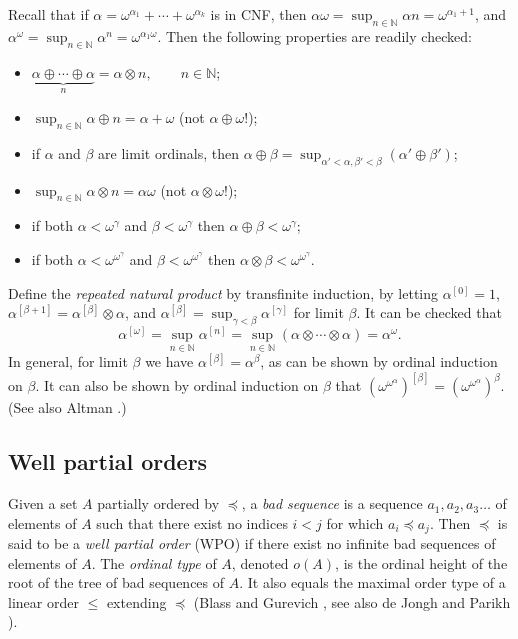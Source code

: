 \documentclass{article}
\theoremstyle{definition}
\begin{document}
Recall that if $\alpha=\omega^{\alpha_1}+\cdots+\omega^{\alpha_k}$ is in CNF, then $\alpha\omega = \sup_{n\in\mathbb N} \alpha n = \omega^{\alpha_1+1}$, and $\alpha^\omega = \sup_{n\in\mathbb N} \alpha^n= \omega^{\alpha_1\omega}$. Then the following properties are readily checked:
\begin{itemize}
    \item $\underbrace{\alpha\oplus\cdots\oplus\alpha}_n = \alpha\otimes n,\qquad n\in\mathbb N$;
    \item $\sup_{n\in\mathbb N}\alpha\oplus n = \alpha+\omega$ (not $\alpha\oplus\omega$!);
    \item if $\alpha$ and $\beta$ are limit ordinals, then $\alpha\oplus\beta = \sup_{\alpha'<\alpha,\beta'<\beta} (\alpha'\oplus\beta')$;
    \item $\sup_{n\in\mathbb N}\alpha\otimes n = \alpha\omega$ (not $\alpha\otimes\omega$!);
    \item if both $\alpha<\omega^\gamma$ and $\beta<\omega^\gamma$ then $\alpha\oplus\beta<\omega^\gamma$;
    \item if both $\alpha<\omega^{\omega^\gamma}$ and $\beta<\omega^{\omega^\gamma}$ then $\alpha\otimes\beta<\omega^{\omega^\gamma}$.
\end{itemize}

Define the \emph{repeated natural product} by transfinite induction, by letting $\alpha^{[0]} = 1$, $\alpha^{[\beta+1]}=\alpha^{[\beta]}\otimes\alpha$, and $\alpha^{[\beta]}=\sup_{\gamma<\beta}\alpha^{[\gamma]}$ for limit $\beta$. It can be checked that
\begin{equation*}
    \alpha^{[\omega]} = \sup_{n\in\mathbb N} \alpha^{[n]} = \sup_{n\in\mathbb N} (\alpha\otimes\cdots\otimes\alpha) = \alpha^\omega.
\end{equation*}
In general, for limit $\beta$ we have $\alpha^{[\beta]} = \alpha^\beta$, as can be shown by ordinal induction on $\beta$. It can also be shown by ordinal induction on $\beta$ that $(\omega^{\omega^\alpha})^{[\beta]} = (\omega^{\omega^\alpha})^\beta$. (See also Altman \cite{altman}.)

\subsection{Well partial orders}\label{subsec_WPO}

Given a set $A$ partially ordered by $\preceq$, a \emph{bad sequence} is a sequence $a_1,a_2,a_3\ldots$ of elements of $A$ such that there exist no indices $i<j$ for which $a_i\preceq a_j$. Then $\preceq$ is said to be a \emph{well partial order} (WPO) if there exist no infinite bad sequences of elements of $A$. The \emph{ordinal type} of $A$, denoted $o(A)$, is the ordinal height of the root of the tree of bad sequences of $A$. It also equals the maximal order type of a linear order $\le$ extending $\preceq$ (Blass and Gurevich \cite{blass_gurevich}, see also de Jongh and Parikh \cite{dejongh_parikh}).
\end{document}
